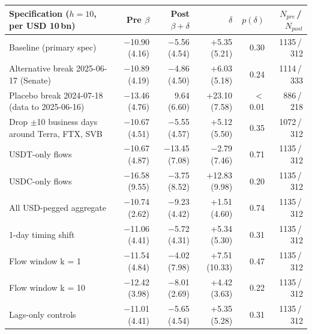 \begin{tabular}{lrrrrr}
\toprule
Specification ($h=10$, per USD 10\,bn) & Pre $\beta$ & Post $\beta+\delta$ & $\delta$ & $p(\delta)$ & $N_{pre}$\,/\,$N_{post}$ \\
\midrule
Baseline (primary spec) & \ensuremath{-}10.90 (4.16) & \ensuremath{-}5.56 (4.54) & +5.35 (5.21) & 0.30 & 1135\,/\,312 \\
Alternative break 2025-06-17 (Senate) & \ensuremath{-}10.89 (4.19) & \ensuremath{-}4.86 (4.50) & +6.03 (5.18) & 0.24 & 1114\,/\,333 \\
\midrule
Placebo break 2024-07-18 (data to 2025-06-16) & \ensuremath{-}13.46 (4.76) & 9.64 (6.60) & +23.10 (7.58) & $<$0.01 & 886\,/\,218 \\
\midrule
Drop $\pm$10 business days around Terra, FTX, SVB & \ensuremath{-}10.67 (4.51) & \ensuremath{-}5.55 (4.57) & +5.12 (5.50) & 0.35 & 1072\,/\,312 \\
USDT-only flows & \ensuremath{-}10.67 (4.87) & \ensuremath{-}13.45 (7.08) & \ensuremath{-}2.79 (7.46) & 0.71 & 1135\,/\,312 \\
USDC-only flows & \ensuremath{-}16.58 (9.55) & \ensuremath{-}3.75 (8.52) & +12.83 (9.98) & 0.20 & 1135\,/\,312 \\
All USD-pegged aggregate & \ensuremath{-}10.74 (2.62) & \ensuremath{-}9.23 (4.42) & +1.51 (4.60) & 0.74 & 1135\,/\,312 \\
1-day timing shift & \ensuremath{-}11.06 (4.41) & \ensuremath{-}5.72 (4.31) & +5.34 (5.30) & 0.31 & 1135\,/\,312 \\
Flow window k = 1 & \ensuremath{-}11.54 (4.84) & \ensuremath{-}4.02 (7.98) & +7.51 (10.33) & 0.47 & 1135\,/\,312 \\
Flow window k = 10 & \ensuremath{-}12.42 (3.98) & \ensuremath{-}8.01 (2.69) & +4.42 (3.63) & 0.22 & 1135\,/\,312 \\
Lags-only controls & \ensuremath{-}11.01 (4.41) & \ensuremath{-}5.65 (4.54) & +5.35 (5.28) & 0.31 & 1135\,/\,312 \\
\bottomrule
\end{tabular}
